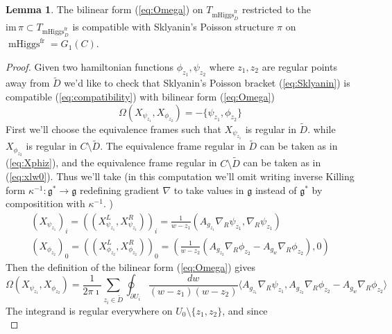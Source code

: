 \documentclass[11pt, oneside, reqno]{amsart}
\theoremstyle{definition} \newtheorem{definition}{Definition}[section]
\newtheorem{lemma}[definition]{Lemma}
\theoremstyle{definition} \newtheorem{remark}[definition]{Remark}
\theoremstyle{definition} \newtheorem{remarks}[definition]{Remarks}
\theoremstyle{definition} \newtheorem{question}[definition]{Question}
\theoremstyle{definition} \newtheorem*{note}{Note}
\theoremstyle{definition} \newtheorem{example}[definition]{Example}
\theoremstyle{definition} \newtheorem{examples}[definition]{Examples}
\renewcommand{\gg}{\mathfrak{g}}
\DeclareMathOperator{\mhiggs}{mHiggs}
\newcommand{\fr}{\mathrm{fr}}
\begin{document}
\begin{lemma}\label{lemma:OmegaPi}
  The bilinear form (\ref{eq:Omega}) on $T_{\mhiggs^{\fr}_{D}}$ 
restricted to the $\mathrm{im} \, \pi \subset T_{\mhiggs^{\fr}_{D}}$  is compatible
  with Sklyanin's Poisson structure $\pi$ on $\mhiggs^{\fr} = G_1(C)$.
\end{lemma}
\begin{proof}
  Given two hamiltonian functions $\phi_{z_1}, \psi_{z_2}$ where $z_1, z_2$ are regular
  points away from $\tilde D$ we'd like to check
  that Sklyanin's Poisson bracket (\ref{eq:Sklyanin})  
is compatible (\ref{eq:compatibility}) with bilinear form  (\ref{eq:Omega})
\begin{equation}
  \Omega(X_{\psi_{z_1}}, X_{\phi_{z_2}})  = - \{\psi_{z_1}, \phi_{z_2}\}
\end{equation}
First we'll choose the equivalence frames such that $X_{\psi_{z_1}}$ is regular in $\tilde D$. 
while $X_{\phi_{z_2}}$ is regular in $C \setminus \tilde D$.
The equivalence frame regular in $\tilde D$ can be taken as in  (\ref{eq:Xphiz}),
and the equivalence frame regular in $C \setminus \tilde D$ can be taken
as in (\ref{eq:xlw0}). Thus we'll take (in this computation we'll omit writing inverse
Killing form $\kappa^{-1}: \gg^{*} \to \gg $ redefining gradient $\nabla$ to take values in $\gg$ instead of $\gg^{*}$
by compositition with $\kappa^{-1}$. )
\begin{equation}
  \begin{aligned}
    (X_{\psi_{z_1}})_{i} = ((X_{\psi_{z_1}}^{L}, X_{\psi_{z_1}}^{R}))_{i} =  \frac{1}{w - z_1} (A_{g_{z_1}} \nabla_R \psi_{z_1},   \nabla_{R} \psi_{z_1}) \\
    (X_{\phi_{z_2}})_{0} = ((X_{\phi_{z_2}}^{L}, X_{\phi_{z_2}}^{R}))_{0} = ( \frac{1}{w - z_2} ( A_{g_{z_2}} \nabla_R \phi_{z_2} - A_{g_{w}} \nabla_{R} \phi_{z_2}), 0) 
  \end{aligned}
\end{equation}
Then the definition of the bilinear form (\ref{eq:Omega}) gives
\begin{equation}
  \label{eq:pairing}
  \Omega(X_{\psi_{z_1}}, X_{\phi_{z_2}}) = \frac{1}{2 \pi \imath }
  \sum_{z_i \in \tilde D} \oint_{\partial U_i} \frac{dw }{(w - z_1)(w - z_2)} \langle A_{g_{z_1}} \nabla_{R} \psi_{z_1},
  A_{g_{z_2}} \nabla_{R} \phi_{z_2}  - A_{g_w} \nabla_{R} \phi_{z_2} \rangle
\end{equation}
The integrand is regular everywhere on $U_0 \setminus \{z_1, z_2\}$, and since
\begin{equation}

\end{equation}
\end{proof}
\end{document}

